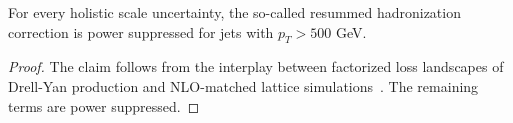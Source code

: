 \begin{theorem}[Positivity]\label{thm:6}
For every holistic scale uncertainty, the so-called resummed
hadronization correction is power suppressed for jets with $p_T > 500$
GeV.
\end{theorem}

\begin{proof}
The claim follows from the interplay between factorized loss landscapes
of Drell-Yan production and NLO-matched lattice
simulations~\cite{TPC:1055-VECTOR-Virtual-Eikonal-Calibrated-Two-Loop-Ordered-Regions-October-8-2026}.
The remaining terms are power suppressed.
\end{proof}

